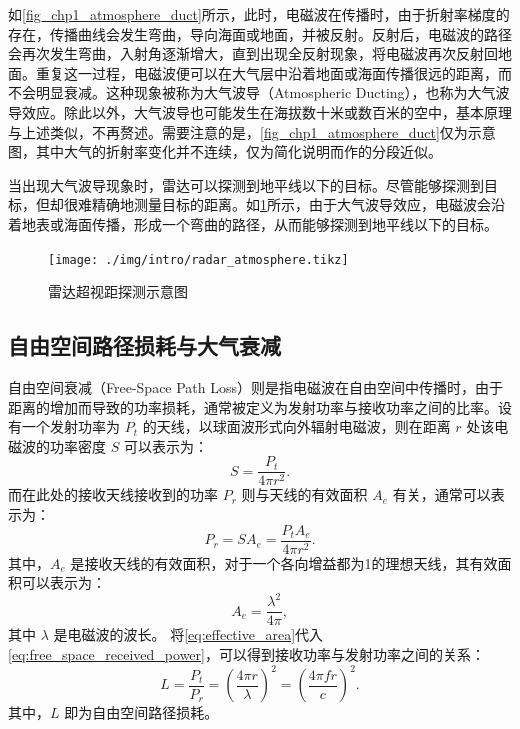 如\cref{fig_chp1_atmosphere_duct}所示，此时，电磁波在传播时，由于折射率梯度的存在，传播曲线会发生弯曲，导向海面或地面，并被反射。反射后，电磁波的路径会再次发生弯曲，入射角逐渐增大，直到出现全反射现象，将电磁波再次反射回地面。重复这一过程，电磁波便可以在大气层中沿着地面或海面传播很远的距离，而不会明显衰减。这种现象被称为大气波导（Atmospheric Ducting），也称为大气波导效应。除此以外，大气波导也可能发生在海拔数十米或数百米的空中，基本原理与上述类似，不再赘述。需要注意的是，\cref{fig_chp1_atmosphere_duct}仅为示意图，其中大气的折射率变化并不连续，仅为简化说明而作的分段近似。

当出现大气波导现象时，雷达可以探测到地平线以下的目标。尽管能够探测到目标，但却很难精确地测量目标的距离。如\cref{fig_chp1_radar_ducting}所示，由于大气波导效应，电磁波会沿着地表或海面传播，形成一个弯曲的路径，从而能够探测到地平线以下的目标。
\begin{figure}[htb!]
    \centering
    \texttt{[image: ./img/intro/radar\_atmosphere.tikz]}
    \caption{雷达超视距探测示意图}
    \label{fig_chp1_radar_ducting}
\end{figure}

\subsection{自由空间路径损耗与大气衰减}

自由空间衰减（Free-Space Path Loss）则是指电磁波在自由空间中传播时，由于距离的增加而导致的功率损耗，通常被定义为发射功率与接收功率之间的比率。设有一个发射功率为 $P_t$ 的天线，以球面波形式向外辐射电磁波，则在距离 $r$ 处该电磁波的功率密度 $S$ 可以表示为：
\begin{equation*}
    S = \frac{P_t}{4 \pi r^2}.
    \label{eq:free_space_power_density}
\end{equation*}
而在此处的接收天线接收到的功率 $P_r$ 则与天线的有效面积 $A_e$ 有关，通常可以表示为：
\begin{equation*}
    P_r = S A_e = \frac{P_t A_e}{4 \pi r^2}.
    \label{eq:free_space_received_power}
\end{equation*}
其中，$A_e$ 是接收天线的有效面积，对于一个各向增益都为1的理想天线，其有效面积可以表示为：
\begin{equation*}
    A_e = \frac{\lambda^2}{4 \pi},
    \label{eq:effective_area}
\end{equation*}
其中 $\lambda$ 是电磁波的波长。
将\cref{eq:effective_area}代入\cref{eq:free_space_received_power}，可以得到接收功率与发射功率之间的关系：
\begin{equation}
    L = \frac{P_t}{P_r} = \left( \frac{4 \pi r}{\lambda} \right)^2 = \left( \frac{4 \pi f r}{c} \right)^2.
    \label{eq:free_space_received_power_final}
\end{equation}
其中，$L$ 即为自由空间路径损耗。

